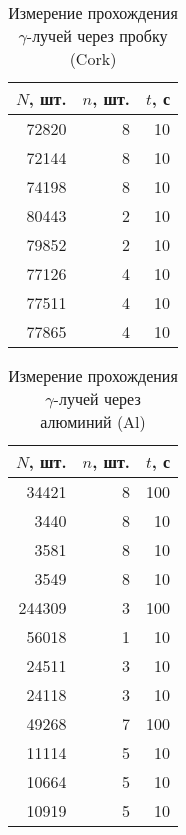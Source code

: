 \begin{table}[ht]
    \centering
    \caption{Измерение прохождения $\gamma$-лучей через пробку (Cork)}
\begin{tabular}{rrr}
\toprule
 $N$, шт. &  $n$, шт. &  $t$, с \\
\midrule
      72820 &           8 &        10 \\
      72144 &           8 &        10 \\
      74198 &           8 &        10 \\
      80443 &           2 &        10 \\
      79852 &           2 &        10 \\
      77126 &           4 &        10 \\
      77511 &           4 &        10 \\
      77865 &           4 &        10 \\
\bottomrule
\end{tabular}
\end{table}



\begin{table}[ht]
    \centering
    \caption{Измерение прохождения $\gamma$-лучей через алюминий (Al)}
\begin{tabular}{rrr}
\toprule
 $N$, шт. &  $n$, шт. &  $t$, с \\
\midrule
      34421 &           8 &       100 \\
       3440 &           8 &        10 \\
       3581 &           8 &        10 \\
       3549 &           8 &        10 \\
     244309 &           3 &       100 \\
      56018 &           1 &        10 \\
      24511 &           3 &        10 \\
      24118 &           3 &        10 \\
      49268 &           7 &       100 \\
      11114 &           5 &        10 \\
      10664 &           5 &        10 \\
      10919 &           5 &        10 \\
\bottomrule
\end{tabular}
\end{table}


